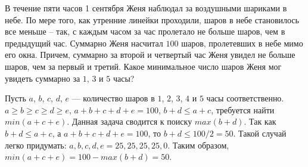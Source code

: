 
В течение пяти часов 1 сентября Женя наблюдал за воздушными шариками в небе. По мере того, как утренние линейки проходили, шаров в небе становилось все меньше -- так, с каждым часом за час пролетало не больше шаров, чем в предыдущий час. Суммарно Женя насчитал $100$ шаров, пролетевших в небе мимо его окна. Причем, суммарно за второй и четвертый час Женя увидел не больше шаров, чем за первый и третий. Какое минимальное число шаров Женя мог увидеть суммарно за $1$, $3$ и $5$ часы?

\solutionSection

Пусть $a$, $b$, $c$, $d$, $e$ — количество шаров в $1$, $2$, $3$, $4$ и $5$ часы соответственно. $a\geq  b \geq c \geq d \geq e$, $a + b + c + d + e = 100$, $b + d \leq a + c$, требуется найти $min(a + c + e)$. Данная задача сводится к поиску $max (b + d)$. Так как $b + d \leq a+c$, а $a + b + c + d + e = 100$, то $b + d \leq 100/2 = 50$. Такой случай легко придумать: $a,b,c,d,e = 25,25,25,25,0$. Таким образом, $min (a + c + e) = 100 - max(b + d) = 50$.

